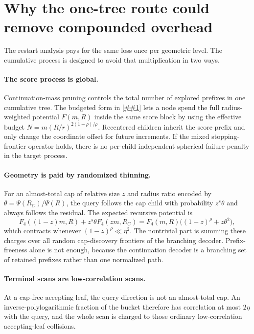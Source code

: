 \documentclass[10pt]{article}
\newcommand{\cref}[1]{\ref{##1}}
\theoremstyle{definition}
\begin{document}
\section{Why the one-tree route could remove compounded overhead}

The restart analysis pays for the same loss once per geometric level. The cumulative process is designed to avoid that multiplication in two ways.

\paragraph{The score process is global.}
Continuation-mass pruning controls the total number of explored prefixes in one cumulative tree. The budgeted form in \cref{cor:radius-budgeted-block} lets a node spend the full radius-weighted potential $F(m,R)$ inside the same score block by using the effective budget $N=m(R/r)^{2(1-\rho)/\rho}$. Recentered children inherit the score prefix and only change the coordinate offset for future increments. If the mixed stopping-frontier operator holds, there is no per-child independent spherical failure penalty in the target process.

\paragraph{Geometry is paid by randomized thinning.}
For an almost-total cap of relative size $z$ and radius ratio encoded by $\theta=\Psi(R_C)/\Psi(R)$, the query follows the cap child with probability $z^s\theta$ and always follows the residual. The expected recursive potential is
\[
   F_4((1-z)m,R)+z^s\theta F_4(zm,R_C)
   =
   F_4(m,R)\bigl((1-z)^\rho+z\theta^2\bigr),
\]
which contracts whenever $(1-z)^\rho\ll\eta^2$. The nontrivial part is summing these charges over all random cap-discovery frontiers of the branching decoder. Prefix-freeness alone is not enough, because the continuation decoder is a branching set of retained prefixes rather than one normalized path.

\paragraph{Terminal scans are low-correlation scans.}
At a cap-free accepting leaf, the query direction is not an almost-total cap. An inverse-polylogarithmic fraction of the bucket therefore has correlation at most $2\eta$ with the query, and the whole scan is charged to those ordinary low-correlation accepting-leaf collisions.
\end{document}
